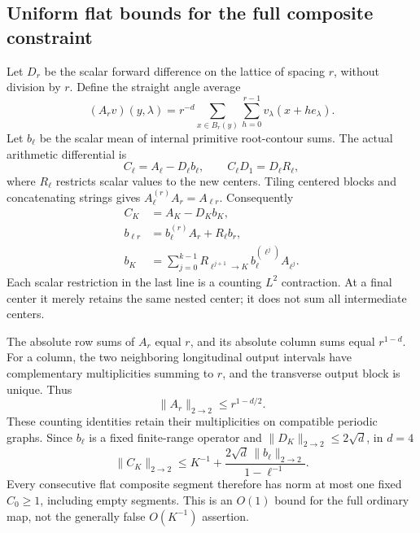 \subsection{Uniform flat bounds for the full composite constraint}
\label{vst-flat-section}

Let \(D_r\) be the scalar forward difference on the lattice
of spacing \(r\), without division by \(r\). Define the
straight angle average
\begin{equation}
 (A_r v)(y,\lambda)=r^{-d}
       \sum_{x\in B_r(y)}\sum_{h=0}^{r-1}
                              v_\lambda(x+h e_\lambda).
 \label{vst-straight}
\end{equation}
Let \(b_\ell\) be the scalar mean of internal primitive
root-contour sums. The actual arithmetic differential is
\begin{equation}
 C_\ell=A_\ell-D_\ell b_\ell,\qquad
 C_\ell D_1=D_\ell R_\ell,
 \label{vst-primitive}
\end{equation}
where \(R_\ell\) restricts scalar values to the new centers.
Tiling centered blocks and concatenating strings gives
\(A_\ell^{(r)}A_r=A_{\ell r}\). Consequently
\begin{equation}
 \begin{split}
 C_K&=A_K-D_Kb_K,\\
 b_{\ell r}&=b_\ell^{(r)}A_r+R_\ell b_r,\\
 b_K&=\sum_{j=0}^{k-1}
       R_{\ell^{j+1}\to K}\,b_\ell^{(\ell^j)}A_{\ell^j}.
 \end{split}
 \label{vst-recursion}
\end{equation}
Each scalar restriction in the last line is a counting
\(L^2\) contraction. At a final center it merely retains
the same nested center; it does not sum all intermediate
centers.

The absolute row sums of \(A_r\) equal \(r\), and its
absolute column sums equal \(r^{1-d}\). For a column,
the two neighboring longitudinal output intervals have
complementary multiplicities summing to \(r\), and the
transverse output block is unique. Thus
\begin{equation}
                \|A_r\|_{2\to2}\le r^{1-d/2}.
 \label{vst-straight-norm}
\end{equation}
These counting identities retain their multiplicities
on compatible periodic graphs. Since \(b_\ell\) is a
fixed finite-range operator and
\(\|D_K\|_{2\to2}\le2\sqrt d\), in \(d=4\)
\begin{equation}
 \|C_K\|_{2\to2}
 \le K^{-1}+
       \frac{2\sqrt d\,\|b_\ell\|_{2\to2}}{1-\ell^{-1}}.
 \label{vst-full-flat}
\end{equation}
Every consecutive flat composite segment therefore has
norm at most one fixed \(C_0\ge1\), including empty segments.
This is an \(O(1)\) bound for the full ordinary map, not
the generally false \(O(K^{-1})\) assertion.

